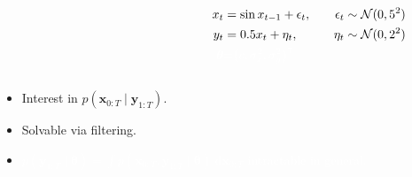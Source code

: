 \documentclass{beamer}
\newcommand{\bx}{\bm{x}}
\newcommand{\by}{\bm{y}}
\newcommand{\btheta}{\bm{\theta}}
\newcommand{\obs}{g}
\newcommand{\dx}[1]{\mathrm{d}{#1}}
\begin{document}
\begin{frame}
\begin{columns}
\begin{column}{0.5\textwidth}
\begin{figure}[ht]
{
                }
                \label{fig:graphical-model1}
            \end{figure}            
        \end{column}
%
        \begin{column}{0.5\textwidth}
            \begin{alignat*}{2}
            x_t & = \sin x_{t-1} + \epsilon_t, \quad & \epsilon_t \sim \mathcal{N}(0, 5^2) \\
            y_t & = 0.5 x_t + \eta_t, \quad & \eta_t \sim \mathcal{N}(0, 2^2) \\
            \textcolor{white}{\btheta} & \textcolor{white}{=} \textcolor{white}{\left(c, \sigma_x^2, \sigma_y^2\right)^\intercal} &
            \end{alignat*}
        \end{column}
    \end{columns}

    \begin{itemize}
        \item Interest in $p(\bx_{0:T} \mid \by_{1:T})$.
        \item Solvable via filtering.
        \item[\textcolor{white}{\textbullet}] \textcolor{white}{$p(\by_{1:T} \mid \btheta) = \int p(\bx_{0:T}, \by_{1:T} \mid \btheta) \; \dx{\bx_{0:T}}$ intractable in general.}
    \end{itemize}
    \end{frame}
\end{document}
